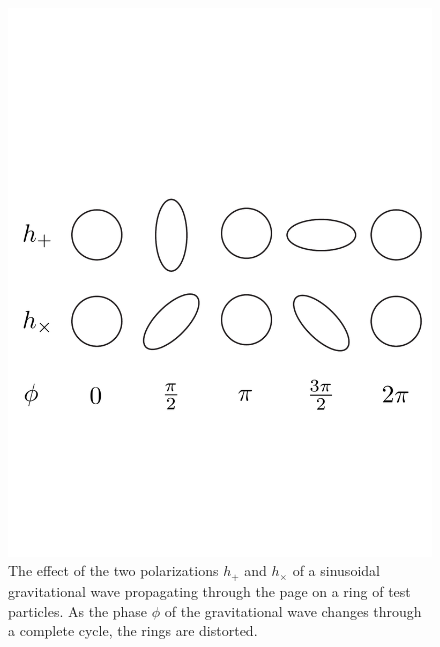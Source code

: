 \begin{figure}[p]
\begin{center}
\includegraphics[width=\linewidth]{figures/inspiral/rings}
\end{center}
\caption[Effect of a Gravitational Wave Polarizations on a Ring of Particles]{%
\label{f:rings}
The effect of the two polarizations $h_+$ and $h_\times$ of a sinusoidal
gravitational wave propagating through the page on a ring of test particles.
As the phase $\phi$ of the gravitational wave changes through a complete
cycle, the rings are distorted.
}
\end{figure}


